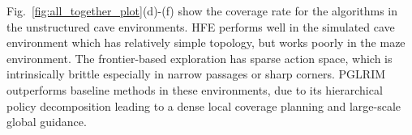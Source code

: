 \documentclass[letterpaper]{article} %
\begin{document}
Fig.~\ref{fig:all_together_plot}(d)-(f) show the coverage rate for the algorithms in the unstructured cave environments. 
HFE performs well in the simulated cave environment which has relatively simple topology, but works poorly in the maze environment.
The frontier-based exploration has sparse action space, which is intrinsically brittle especially in narrow passages or sharp corners.
PGLRIM outperforms baseline methods in these environments, due to its hierarchical policy decomposition leading to a dense local coverage planning and large-scale global guidance.

\begin{figure}[h!]
\centering
\end{figure}
\end{document}
